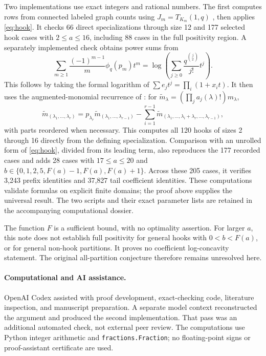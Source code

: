 \documentclass[11pt]{article}
\begin{document}
Two implementations use exact integers and rational numbers. The first
computes rows from connected labeled graph counts using
$J_m=T_{K_m}(1,q)$ \cite[Equation~(1.2)]{BrugidouTutte}, then applies
\eqref{eq:hook}. It checks 66 direct specializations through size 12 and
177 selected hook cases with $2\leq a\leq16$, including 88 cases in the
full positivity region. A separately implemented check obtains power sums
from
\begin{equation}\label{eq:log}
 \sum_{m\geq1}\frac{(-1)^{m-1}}{m}\phi_q(p_m)t^m
 =\log\left(\sum_{j\geq0}\frac{q^{\binom j2}}{j!}t^j\right).
\end{equation}
This follows by taking the formal logarithm of
$\sum e_jt^j=\prod_i(1+x_it)$.
It then uses the augmented-monomial recurrence of
\cite[Theorem~1]{MercaAugmented}: for
$\widetilde m_\lambda=(\prod_j a_j(\lambda)!)m_\lambda$,
\[
 \widetilde m_{(\lambda_1,\ldots,\lambda_r)}
 =p_{\lambda_r}\widetilde m_{(\lambda_1,\ldots,\lambda_{r-1})}
 -\sum_{i=1}^{r-1}
 \widetilde m_{(\lambda_1,\ldots,\lambda_i+\lambda_r,\ldots,\lambda_{r-1})},
\]
with parts reordered when necessary. This computes all 120 hooks of
sizes 2 through 16 directly from the defining specialization.
Comparison with an unrolled form of \eqref{eq:hook}, divided from its
leading term, also reproduces the 177 recorded cases and adds 28 cases
with $17\leq a\leq20$ and
$b\in\{0,1,2,5,F(a)-1,F(a),F(a)+1\}$.
Across these 205 cases, it verifies 3,243 prefix identities and 37,827
tail coefficient identities. These computations validate formulas on
explicit finite domains; the proof above supplies the universal result.
The two scripts and their exact parameter lists are retained in the
accompanying computational dossier.

The function $F$ is a sufficient bound, with no optimality assertion.
For larger $a$, this note does not establish full positivity for general
hooks with $0<b<F(a)$, or for general non-hook partitions. It proves no
coefficient log-concavity statement. The original all-partition conjecture
therefore remains unresolved here.

\paragraph{Computational and AI assistance.}
OpenAI Codex assisted with proof development, exact-checking code,
literature inspection, and manuscript preparation. A separate model
context reconstructed the argument and produced the second implementation.
That pass was an additional automated check, not external peer review.
The computations use Python integer arithmetic and \texttt{fractions.Fraction};
no floating-point signs or proof-assistant certificate are used.


\small
\raggedright


\end{document}

